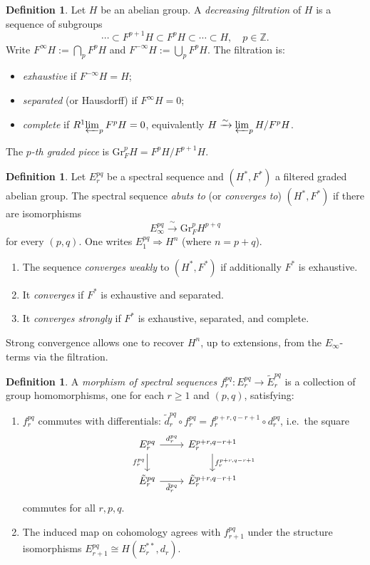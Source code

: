 \documentclass[12pt,a4paper]{article}
\theoremstyle{definition}
\newtheorem{definition}[theorem]{Definition}
\newcommand{\Gr}{\mathrm{Gr}}
\newcommand{\Z}{\mathbb{Z}}
\begin{document}
\begin{definition}\label{def:filtration}
Let $H$ be an abelian group.  A \emph{decreasing filtration} of $H$ is a sequence
of subgroups
\[
  \cdots\subset F^{p+1}H\subset F^pH\subset\cdots\subset H,\quad p\in\Z.
\]
Write $F^\infty H:=\bigcap_p F^pH$ and $F^{-\infty}H:=\bigcup_p F^pH$.
The filtration is:
\begin{itemize}
  \item \emph{exhaustive} if $F^{-\infty}H=H$;
  \item \emph{separated} (or Hausdorff) if $F^\infty H=0$;
  \item \emph{complete} if $R^1\!\varprojlim_p F^pH=0$, equivalently
    $H\xrightarrow{\sim}\varprojlim_p H/F^pH$.
\end{itemize}
The \emph{$p$-th graded piece} is $\Gr_F^p H = F^pH/F^{p+1}H$.
\end{definition}

\begin{definition}\label{def:convergence}
Let $E_r^{pq}$ be a spectral sequence and $(H^*,F^*)$ a filtered graded abelian
group.  The spectral sequence \emph{abuts to} (or \emph{converges to})
$(H^*,F^*)$ if there are isomorphisms
\[
  E_\infty^{pq} \xrightarrow{\;\sim\;} \Gr_F^p H^{p+q}
\]
for every $(p,q)$.  One writes $E_1^{pq}\Rightarrow H^n$ (where $n=p+q$).
\begin{enumerate}[label=\textup{(\roman*)}]
  \item The sequence \emph{converges weakly} to $(H^*,F^*)$ if additionally $F^*$
    is exhaustive.
  \item It \emph{converges} if $F^*$ is exhaustive and separated.
  \item It \emph{converges strongly} if $F^*$ is exhaustive, separated, and
    complete.
\end{enumerate}
Strong convergence allows one to recover $H^n$, up to extensions, from the
$E_\infty$-terms via the filtration.
\end{definition}

\begin{definition}\label{def:SS-morphism}
A \emph{morphism of spectral sequences} $f_r^{pq}:E_r^{pq}\to\tilde{E}_r^{pq}$
is a collection of group homomorphisms, one for each $r\geq 1$ and $(p,q)$,
satisfying:
\begin{enumerate}
  \item $f_r^{pq}$ commutes with differentials:
    $\tilde{d}_r^{pq}\circ f_r^{pq}=f_r^{p+r,q-r+1}\circ d_r^{pq}$, i.e.\
    the square
    \[
    \begin{tikzcd}
      E_r^{pq} \ar[r,"d_r^{pq}"] \ar[d,"f_r^{pq}"'] &
        E_r^{p+r,q-r+1} \ar[d,"f_r^{p+r,q-r+1}"] \\
      \tilde{E}_r^{pq} \ar[r,"\tilde{d}_r^{pq}"'] &
        \tilde{E}_r^{p+r,q-r+1}
    \end{tikzcd}
    \]
    commutes for all $r,p,q$.
  \item The induced map on cohomology agrees with $f_{r+1}^{pq}$ under the
    structure isomorphisms $E_{r+1}^{pq}\cong H(E_r^{**},d_r)$.
\end{enumerate}
\end{definition}
\end{document}
